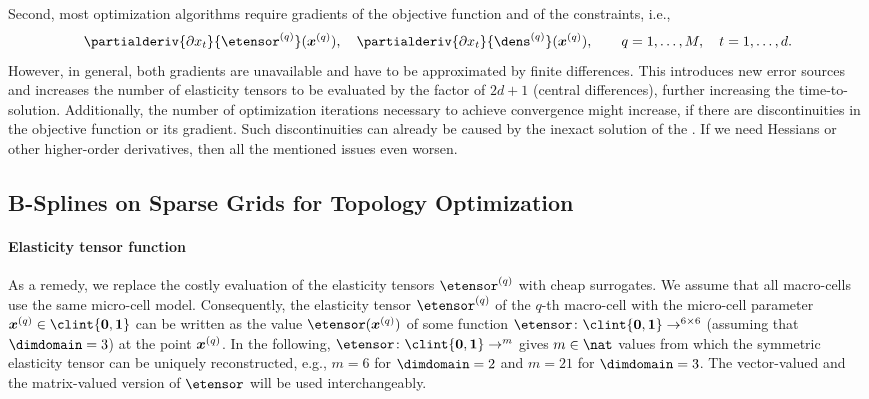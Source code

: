 Second, most optimization algorithms require gradients of the
objective function and of the constraints, i.e.,%
\begin{equation}
  \partialderiv{\partialdiff{} x_t}{\etensor^{(q)}}(\*x^{(q)}),\quad
  \partialderiv{\partialdiff{} x_t}{\dens^{(q)}}(\*x^{(q)}),\qquad
  q = 1, \dotsc, M,\quad
  t = 1, \dotsc, d.
\end{equation}
However, in general, both gradients are unavailable and
have to be approximated by finite differences.
This introduces new error sources and
increases the number of elasticity tensors to be evaluated
by the factor of $2d + 1$ (central differences),
further increasing the time-to-solution.
Additionally, the number of optimization iterations necessary to
achieve convergence might increase,
if there are discontinuities in the objective function
or its gradient.
Such discontinuities can already be caused by the inexact solution of the \fem.
If we need Hessians or other higher-order derivatives,
then all the mentioned issues even worsen.



\subsection{B-Splines on Sparse Grids for Topology Optimization}
\label{sec:622BSplines}

\paragraph{Elasticity tensor function}

As a remedy, we replace the costly evaluation of the
elasticity tensors $\etensor^{(q)}$ with cheap surrogates.
We assume that all macro-cells use the same micro-cell model.
Consequently, the elasticity tensor $\etensor^{(q)}$ of the $q$-th macro-cell
with the micro-cell parameter $\*x^{(q)} \in \clint{\*0, \*1}$
can be written as the value $\etensor(\*x^{(q)})$ of some function
$\etensor\colon \clint{\*0, \*1} \to \real^{6 \times 6}$
(assuming that $\dimdomain = 3$) at the point ${\boldsymbol{x}}^{(q)}$.
In the following,
$\etensor\colon \clint{\*0, \*1} \to \real^m$
gives $m \in \nat$ values from which the symmetric elasticity tensor
can be uniquely reconstructed,
e.g., $m = 6$ for $\dimdomain = 2$ and $m = 21$ for $\dimdomain = 3$.
The vector-valued and the matrix-valued version of $\etensor$
will be used interchangeably.

